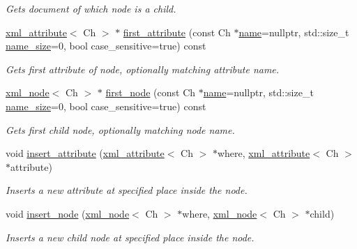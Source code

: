 \begin{DoxyCompactItemize}
\begin{DoxyCompactList}\small\item\em Gets document of which node is a child. \end{DoxyCompactList}\item 
\mbox{\hyperlink{classrapidxml_1_1xml__attribute}{xml\+\_\+attribute}}$<$ Ch $>$ $\ast$ \mbox{\hyperlink{classrapidxml_1_1xml__node_a3cbbee0d76d96c3315cc9d80d169c8d9}{first\+\_\+attribute}} (const Ch $\ast$\mbox{\hyperlink{classrapidxml_1_1xml__base_af8436e9ee14c127220113eaa956eafee}{name}}=nullptr, std\+::size\+\_\+t \mbox{\hyperlink{classrapidxml_1_1xml__base_ad01e2eff02202b130baad012d1ed7328}{name\+\_\+size}}=0, bool case\+\_\+sensitive=true) const
\begin{DoxyCompactList}\small\item\em Gets first attribute of node, optionally matching attribute name. \end{DoxyCompactList}\item 
\mbox{\hyperlink{classrapidxml_1_1xml__node}{xml\+\_\+node}}$<$ Ch $>$ $\ast$ \mbox{\hyperlink{classrapidxml_1_1xml__node_a1290dd3cfbf7cc6384593104635c96cd}{first\+\_\+node}} (const Ch $\ast$\mbox{\hyperlink{classrapidxml_1_1xml__base_af8436e9ee14c127220113eaa956eafee}{name}}=nullptr, std\+::size\+\_\+t \mbox{\hyperlink{classrapidxml_1_1xml__base_ad01e2eff02202b130baad012d1ed7328}{name\+\_\+size}}=0, bool case\+\_\+sensitive=true) const
\begin{DoxyCompactList}\small\item\em Gets first child node, optionally matching node name. \end{DoxyCompactList}\item 
void \mbox{\hyperlink{classrapidxml_1_1xml__node_a070d5888b0557fe06a5b24961de1b988}{insert\+\_\+attribute}} (\mbox{\hyperlink{classrapidxml_1_1xml__attribute}{xml\+\_\+attribute}}$<$ Ch $>$ $\ast$where, \mbox{\hyperlink{classrapidxml_1_1xml__attribute}{xml\+\_\+attribute}}$<$ Ch $>$ $\ast$attribute)
\begin{DoxyCompactList}\small\item\em Inserts a new attribute at specified place inside the node. \end{DoxyCompactList}\item 
void \mbox{\hyperlink{classrapidxml_1_1xml__node_a780972a57fc447250ab47cc8f421b65e}{insert\+\_\+node}} (\mbox{\hyperlink{classrapidxml_1_1xml__node}{xml\+\_\+node}}$<$ Ch $>$ $\ast$where, \mbox{\hyperlink{classrapidxml_1_1xml__node}{xml\+\_\+node}}$<$ Ch $>$ $\ast$child)
\begin{DoxyCompactList}\small\item\em Inserts a new child node at specified place inside the node. \end{DoxyCompactList}\item 

\end{DoxyCompactItemize}
